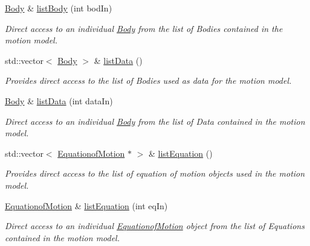 \begin{DoxyCompactItemize}
\hyperlink{classosea_1_1ofreq_1_1_body}{Body} \& \hyperlink{classosea_1_1ofreq_1_1_motion_model_a3c08da3c6cb3e959b53f2cf6f614d3c0}{list\-Body} (int bod\-In)
\begin{DoxyCompactList}\small\item\em Direct access to an individual \hyperlink{classosea_1_1ofreq_1_1_body}{Body} from the list of Bodies contained in the motion model. \end{DoxyCompactList}\item 
std\-::vector$<$ \hyperlink{classosea_1_1ofreq_1_1_body}{Body} $>$ \& \hyperlink{classosea_1_1ofreq_1_1_motion_model_ae63712716bcaff9ff263d9728f39323a}{list\-Data} ()
\begin{DoxyCompactList}\small\item\em Provides direct access to the list of Bodies used as data for the motion model. \end{DoxyCompactList}\item 
\hyperlink{classosea_1_1ofreq_1_1_body}{Body} \& \hyperlink{classosea_1_1ofreq_1_1_motion_model_a1d7e2b929c15789259aaf732efd7f752}{list\-Data} (int data\-In)
\begin{DoxyCompactList}\small\item\em Direct access to an individual \hyperlink{classosea_1_1ofreq_1_1_body}{Body} from the list of Data contained in the motion model. \end{DoxyCompactList}\item 
std\-::vector$<$ \hyperlink{classosea_1_1ofreq_1_1_equationof_motion}{Equationof\-Motion} $\ast$ $>$ \& \hyperlink{classosea_1_1ofreq_1_1_motion_model_a998756fbf76a5c65773f5eae7bf9a3e1}{list\-Equation} ()
\begin{DoxyCompactList}\small\item\em Provides direct access to the list of equation of motion objects used in the motion model. \end{DoxyCompactList}\item 
\hyperlink{classosea_1_1ofreq_1_1_equationof_motion}{Equationof\-Motion} \& \hyperlink{classosea_1_1ofreq_1_1_motion_model_a444cd6e6ca1aea0822545b732118aeb9}{list\-Equation} (int eq\-In)
\begin{DoxyCompactList}\small\item\em Direct access to an individual \hyperlink{classosea_1_1ofreq_1_1_equationof_motion}{Equationof\-Motion} object from the list of Equations contained in the motion model. \end{DoxyCompactList}\item 

\end{DoxyCompactItemize}
